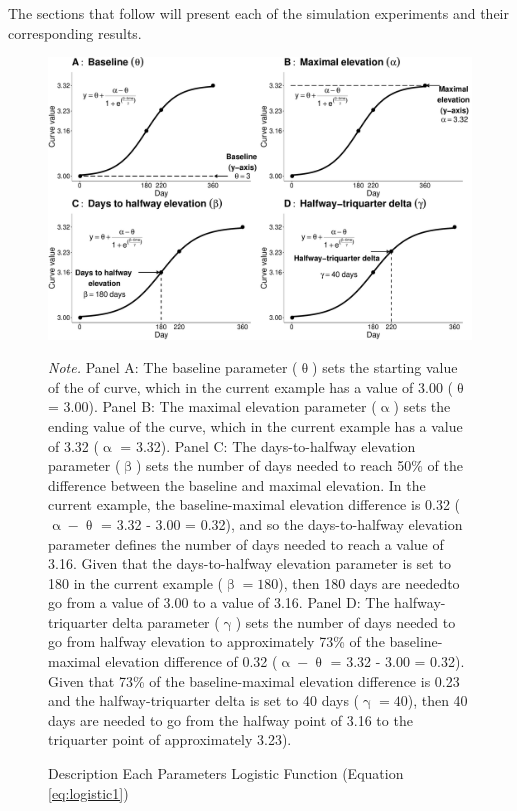 \documentclass[
  english,
  man,floatsintext]{apa7}
\newcommand{\figurefootnote}{\raggedright\linespread{2}\fontfamily{phv}\fontsize{9.5pt}{11.4pt}\selectfont \textit{Note. }}
\begin{document}
\noindent The sections that follow will present each of the simulation experiments and their corresponding results.

\begin{figure}[H]
  \caption{Description Each Parameters Logistic Function (Equation \ref{eq:logistic1})}
  \label{fig:combined_plot_1}
  \includegraphics{Figures/combined_plot} \hfill{}
  \figurefootnote{Panel A: The baseline parameter ($\uptheta$) sets the starting value of the of curve, which in the current example has a value of 3.00 ($\uptheta$ = 3.00). Panel B: The maximal elevation parameter ($\upalpha$) sets the ending value of the curve, which in the current example has a value of 3.32 ($\upalpha$ = 3.32). Panel C: The days-to-halfway elevation parameter ($\upbeta$) sets the number of days needed to reach 50\% of the difference between the baseline and maximal elevation. In the current example, the baseline-maximal elevation difference is 0.32 ($\upalpha - \uptheta$ = 3.32 - 3.00 = 0.32), and so the days-to-halfway elevation parameter defines the number of days needed to reach a value of 3.16. Given that the days-to-halfway elevation parameter is set to 180 in the current example ($\upbeta = 180$), then 180 days are neededto go from a value of 3.00 to a value of 3.16. Panel D: The halfway-triquarter delta parameter ($\upgamma$) sets the number of days needed to go from halfway elevation to approximately 73\% of the baseline-maximal elevation difference of 0.32 ($\upalpha - \uptheta$ = 3.32 - 3.00 = 0.32). Given that 73\% of the baseline-maximal elevation difference is 0.23 and the halfway-triquarter delta is set to 40 days ($\upgamma = 40$), then 40 days are needed to go from the halfway point of 3.16 to the triquarter point of approximately 3.23).}
\end{figure}
\end{document}
